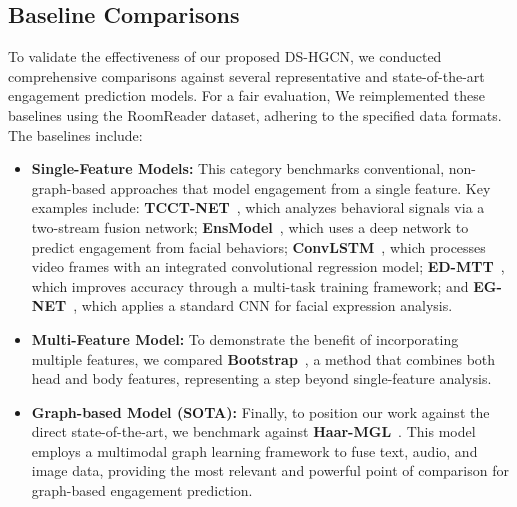 \documentclass[runningheads]{llncs}
\begin{document}

\subsection{Baseline Comparisons}{\label{Baseline Comparisons}}
To validate the effectiveness of our proposed DS-HGCN, we conducted comprehensive comparisons against several representative and state-of-the-art engagement prediction models. For a fair evaluation, We reimplemented these baselines using the RoomReader dataset, adhering to the specified data formats. The baselines include: 

\begin{itemize}
\item[$\bullet$] \textbf{Single-Feature Models:} This category benchmarks conventional, non-graph-based approaches that model engagement from a single feature. Key examples include: \textbf{TCCT-NET}~\cite{vedernikov2024tcct}, which analyzes behavioral signals via a two-stream fusion network; \textbf{EnsModel}~\cite{thong2019engagement}, which uses a deep network to predict engagement from facial behaviors; \textbf{ConvLSTM}~\cite{del2020you}, which processes video frames with an integrated convolutional regression model; \textbf{ED-MTT}~\cite{copur2022engagement}, which improves accuracy through a multi-task training framework; and \textbf{EG-NET}~\cite{mohamad2019automatic}, which applies a standard CNN for facial expression analysis. 


\item[$\bullet$] \textbf{Multi-Feature Model:} To demonstrate the benefit of incorporating multiple features, we compared \textbf{Bootstrap}~\cite{wang2019bootstrap}, a method that combines both head and body features, representing a step beyond single-feature analysis.

\item[$\bullet$] \textbf{Graph-based Model (SOTA):} Finally, to position our work against the direct state-of-the-art, we benchmark against \textbf{Haar-MGL}~\cite{li2024multimodal}. This model employs a multimodal graph learning framework to fuse text, audio, and image data, providing the most relevant and powerful point of comparison for graph-based engagement prediction.
\end{itemize}
\end{document}
